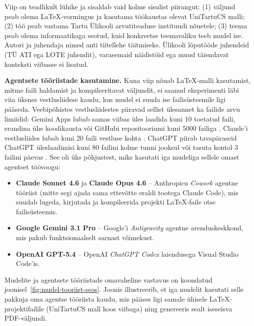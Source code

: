 Viip on teadlikult lühike ja sisaldab vaid kolme sisulist piirangut: (1) väljund peab olema \LaTeX{}-vormingus ja kasutama töökaustas olevat UniTartuCS malli; (2) töö peab vastama Tartu Ülikooli arvutiteaduse instituudi nõuetele; (3) teema peab olema informaatikaga seotud, kuid konkreetse teemavaliku teeb mudel ise. Autori ja juhendaja nimed anti tiitellehe täitmiseks. Ülikooli lõputööde juhendeid (TÜ ATI ega LOTE juhendit), varasemaid näidistöid ega muud täiendavat konteksti viibasse ei lisatud.

\textbf{Agentsete tööriistade kasutamine.} Kuna viip nõuab \LaTeX{}-malli kasutamist, mitme faili haldamist ja kompileeritavat väljundit, ei saanud eksperimenti läbi viia üksnes vestlusliidese kaudu, kus mudel ei suuda ise failisüsteemile ligi pääseda. Veebipõhistes vestlusliidestes piiravad sellist ülesannet ka failide arvu limiidid: Gemini Apps lubab samas viibas üles laadida kuni 10 toetatud faili, erandina ühe koodikausta või GitHubi repositooriumi kuni 5000 failiga \cite{google2026gemini_uploads}. Claude'i vestlusliides lubab kuni 20 faili vestluse kohta \cite{anthropic2026claude_uploads}. ChatGPT piirab tavapäraseid ChatGPT üleslaadimisi kuni 80 failini kolme tunni jooksul või tasuta kontol 3 failini päevas \cite{openai2026file_uploads}. See oli üks põhjustest, miks kasutati iga mudeliga sellele omast agentset töövoogu:
\begin{itemize}
    \item \textbf{Claude Sonnet 4.6} ja \textbf{Claude Opus 4.6} -- Anthropicu \textit{Cowork} agentne tööriist (mitte segi ajada sama ettevõtte eraldi tootega Claude Code), mis suudab lugeda, kirjutada ja kompileerida projekti \LaTeX{}-faile otse failisüsteemis.
    \item \textbf{Google Gemini 3.1 Pro} -- Google'i \textit{Antigravity} agentne arenduskeskkond, mis pakub funktsionaalselt sarnast võimekust.
    \item \textbf{OpenAI GPT-5.4} -- OpenAI \textit{ChatGPT Codex} laiendusega Visual Studio Code'is.
\end{itemize}

Mudelite ja agentsete tööriistade omavaheline vastavus on koondatud joonisel~\ref{fig:mudel-tooriist-seos}. Joonis illustreerib, et iga mudelit kasutati selle pakkuja oma agentse tööriista kaudu, mis pääses ligi samale ühisele \LaTeX{}-projektifailile (UniTartuCS mall koos viibaga) ning genereeris sealt iseseisva PDF-väljundi.

